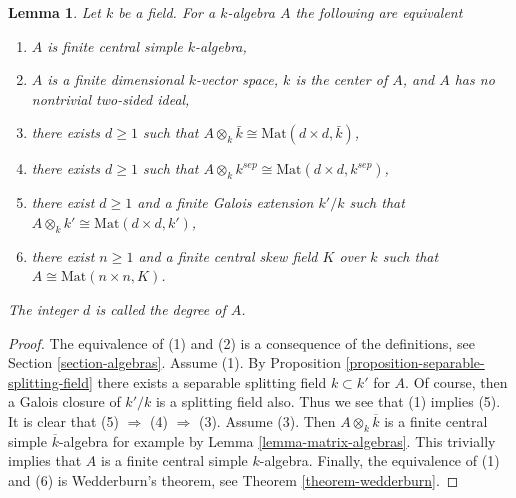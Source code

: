 \documentclass[10pt,a4paper]{amsart}
\theoremstyle{plain}
\newtheorem{lemma}[subsection]{Lemma}
\theoremstyle{definition}
\theoremstyle{remark}
\numberwithin{equation}{subsection}
\begin{document}
\begin{lemma}
\label{lemma-finite-central-simple-algebra}
Let $k$ be a field. For a $k$-algebra $A$ the following are equivalent
\begin{enumerate}
\item $A$ is finite central simple $k$-algebra,
\item $A$ is a finite dimensional $k$-vector space, $k$ is the center of $A$,
and $A$ has no nontrivial two-sided ideal,
\item there exists $d \geq 1$ such that
$A \otimes_k \bar k \cong \text{Mat}(d \times d, \bar k)$,
\item there exists $d \geq 1$ such that
$A \otimes_k k^{sep} \cong \text{Mat}(d \times d, k^{sep})$,
\item there exist $d \geq 1$ and a finite Galois extension $k'/k$
such that
$A \otimes_k k' \cong \text{Mat}(d \times d, k')$,
\item there exist $n \geq 1$ and a finite central skew field $K$
over $k$ such that $A \cong \text{Mat}(n \times n, K)$.
\end{enumerate}
The integer $d$ is called the {\it degree} of $A$.
\end{lemma}

\begin{proof}
The equivalence of (1) and (2) is a consequence of the definitions, see
Section \ref{section-algebras}.
Assume (1). By
Proposition \ref{proposition-separable-splitting-field}
there exists a separable splitting field $k \subset k'$ for $A$.
Of course, then a Galois closure of $k'/k$ is a splitting field also.
Thus we see that (1) implies (5). It is clear that (5) $\Rightarrow$ (4)
$\Rightarrow$ (3). Assume (3). Then $A \otimes_k \overline{k}$
is a finite central simple $\overline{k}$-algebra for example by
Lemma \ref{lemma-matrix-algebras}.
This trivially implies that $A$ is a finite central simple $k$-algebra.
Finally, the equivalence of (1) and (6) is Wedderburn's theorem, see
Theorem \ref{theorem-wedderburn}.
\end{proof}
\end{document}
